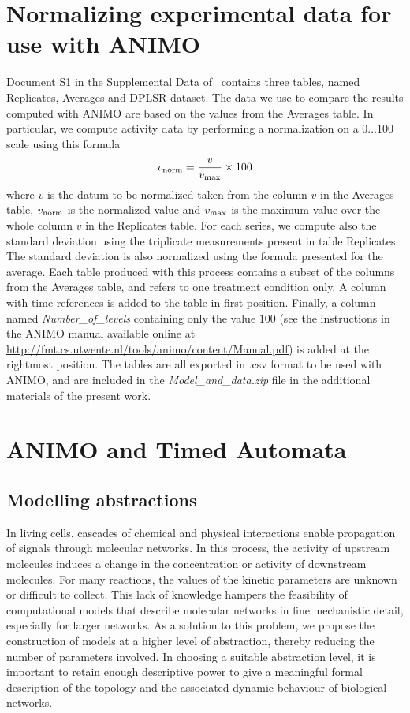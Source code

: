 \documentclass{bmcart}
\begin{document}
\section{Normalizing experimental data for use with ANIMO}\label{suppl-sec:normalization}
Document S1 in the Supplemental Data of~\cite{pathway-autocrine} contains
three tables, named {\sf Replicates}, {\sf Averages} and {\sf DPLSR dataset}.
The data we use to compare the results computed with ANIMO are based on the
values from the {\sf Averages} table.
In particular, we compute activity data by performing a normalization on a $0\dots 100$ scale using this formula
$$
v_{\mbox{\scriptsize norm}} = \frac{v}{v_{\mbox{\scriptsize max}}} \times 100
$$
where $v$ is the datum to be normalized taken from the column $v$ in the {\sf Averages} table,
$v_{\mbox{\scriptsize norm}}$ is the normalized value and
$v_{\mbox{\scriptsize max}}$ is the maximum value over the whole column $v$ in the {\sf Replicates} table.
For each series, we compute also the standard deviation using the triplicate measurements
present in table {\sf Replicates}. The standard deviation is also normalized using the formula presented for the average.
Each table produced with this process contains a subset of the columns from the {\sf Averages} table,
and refers to one treatment condition only. A column with time references is added to the table in first position.
Finally, a column named \emph{Number\_of\_levels} containing only the value $100$ (see the instructions
in the ANIMO manual available online at \url{http://fmt.cs.utwente.nl/tools/animo/content/Manual.pdf}) is added at the rightmost position.
The tables are all exported in .csv format to be used with ANIMO, and are included in the \emph{Model\_and\_data.zip}
file in the additional materials of the present work.


\clearpage
\section{ANIMO and Timed Automata}\label{suppl-sec:animo-ta}
\subsection{Modelling abstractions}\label{subsec:abstractions}

In living cells, cascades of chemical and physical interactions enable propagation of signals through molecular networks.
In this process, the activity of upstream molecules induces a change in the
concentration or activity of downstream molecules. For many reactions, the values of the kinetic parameters
are unknown or difficult to collect. This lack of knowledge hampers the feasibility
of computational models that describe molecular networks in fine mechanistic detail, especially for larger networks.
As a solution to this problem, we propose the construction of models at a higher level of abstraction,
thereby reducing the number of parameters involved. In choosing a suitable abstraction level, it is important to
retain enough descriptive power to give a meaningful formal description of the topology and the
associated dynamic behaviour of biological networks.
\end{document}
